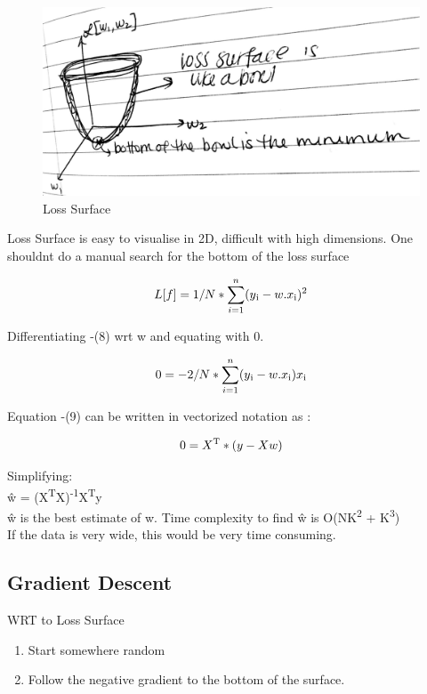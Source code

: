 \begin{figure}[ht]
  \begin{center}
    \includegraphics[width=\textwidth]{figures/fig2.jpg}
    \caption{ Loss Surface}
   \end{center}
\end{figure}

Loss Surface is easy to visualise in 2D, difficult with high dimensions. One shouldnt do a manual search for the bottom of the loss surface

\begin{equation}
	L[f] = 1/ N *  \sum\limits_{i=1}^n (y\textsubscript{i} - w.x\textsubscript{i})^2
\end{equation}

Differentiating -(8) wrt w and equating with 0.

\begin{equation}
	0 = -2/ N *  \sum\limits_{i=1}^n (y\textsubscript{i} - w.x\textsubscript{i})x\textsubscript{i}
\end{equation}

Equation -(9) can be written in vectorized notation as :

\begin{equation}
	0 =  X\textsuperscript{T} * (y - Xw)
\end{equation}

Simplifying:\\

\^{w} =  (X\textsuperscript{T}X)\textsuperscript{-1}X\textsuperscript{T}y \\

\^{w} is the best estimate of w. Time complexity to find \^{w} is O(NK\textsuperscript{2} + K\textsuperscript{3}) \\

If the data is very wide, this would be very time consuming. 

\subsection{Gradient Descent}
WRT to Loss Surface
\begin{enumerate}
  \item Start somewhere random
  \item Follow the negative gradient to the bottom of the surface.
\end{enumerate}


